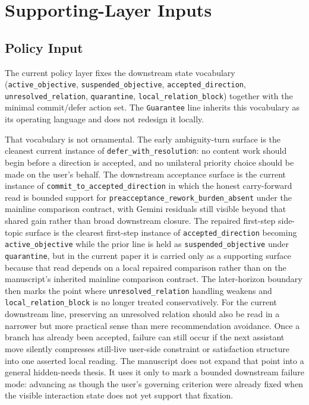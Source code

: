 \documentclass[11pt]{article}
\begin{document}
\section{Supporting-Layer Inputs}

\subsection{Policy Input}

The current policy layer fixes the downstream state vocabulary
(\texttt{active\_objective}, \texttt{suspended\_objective},
\texttt{accepted\_direction}, \texttt{unresolved\_relation},
\texttt{quarantine}, \texttt{local\_relation\_block}) together with the minimal
commit/defer action set. The \texttt{Guarantee} line inherits this vocabulary as
its operating language and does not redesign it locally.

That vocabulary is not ornamental. The early ambiguity-turn surface is the
cleanest current instance of \texttt{defer\_with\_resolution}: no content work
should begin before a direction is accepted, and no unilateral priority choice
should be made on the user's behalf. The downstream acceptance surface is the
current instance of \texttt{commit\_to\_accepted\_direction} in which the
honest carry-forward read is bounded support for
\texttt{preacceptance\_rework\_burden\_absent} under the mainline comparison
contract, with Gemini residuals still visible beyond that shared gain rather
than broad downstream closure. The
repaired first-step side-topic surface is the clearest
first-step instance of \texttt{accepted\_direction} becoming
\texttt{active\_objective} while the prior line is held as
\texttt{suspended\_objective} under \texttt{quarantine}, but in the current
paper it is carried only as a supporting surface because that read depends on a
local repaired comparison rather than on the manuscript's inherited mainline
comparison contract. The later-horizon
boundary then marks the point where \texttt{unresolved\_relation} handling
weakens and \texttt{local\_relation\_block} is no longer treated conservatively.
For the current downstream line, preserving an unresolved relation should also
be read in a narrower but more practical sense than mere recommendation
avoidance. Once a branch has already been accepted, failure can still occur if
the next assistant move silently compresses still-live user-side constraint or
satisfaction structure into one asserted local reading. The manuscript does not
expand that point into a general hidden-needs thesis. It uses it only to mark a
bounded downstream failure mode: advancing as though the user's governing
criterion were already fixed when the visible interaction state does not yet
support that fixation.
\end{document}
